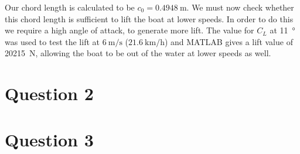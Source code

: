 \documentclass[11pt]{article}
\numberwithin{equation}{section}
\begin{document}

Our chord length is calculated to be $c_0 = \SI{0.4948}{\meter}$. We must now check whether this chord length is sufficient to lift the boat at lower speeds. In order to do this we require a high angle of attack, to generate more lift. The value for $C_L$ at \SI{11}{\degree} was used to test the lift at $\SI{6}{\meter\per\second}$ ($\SI{21.6}{\kilo\meter\per\hour}$) and MATLAB gives a lift value of \SI{20215}{\newton}, allowing the boat to be out of the water at lower speeds as well.
\section{Question 2}
\section{Question 3}
\end{document}
